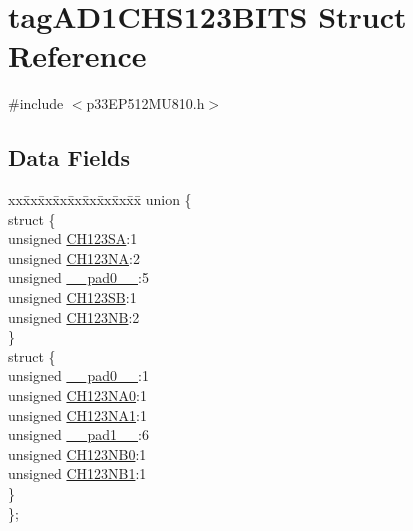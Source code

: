 \hypertarget{structtag_a_d1_c_h_s123_b_i_t_s}{}\section{tag\+A\+D1\+C\+H\+S123\+B\+I\+TS Struct Reference}
\label{structtag_a_d1_c_h_s123_b_i_t_s}


{\ttfamily \#include $<$p33\+E\+P512\+M\+U810.\+h$>$}

\subsection*{Data Fields}
\begin{DoxyCompactItemize}
\item 
\begin{tabbing}
xx\=xx\=xx\=xx\=xx\=xx\=xx\=xx\=xx\=\kill
union \{\\
\>struct \{\\
\>\>unsigned \hyperlink{structtag_a_d1_c_h_s123_b_i_t_s_aa5c792555a378a509a857e720d13fc00}{CH123SA}:1\\
\>\>unsigned \hyperlink{structtag_a_d1_c_h_s123_b_i_t_s_ab77f3f8df06242b31213cffdcdfd203b}{CH123NA}:2\\
\>\>unsigned \hyperlink{structtag_a_d1_c_h_s123_b_i_t_s_adf71f3d8410c1f1dbbc96680a92c49af}{\_\_pad0\_\_}:5\\
\>\>unsigned \hyperlink{structtag_a_d1_c_h_s123_b_i_t_s_a43fe4bf282da0b96630808288b9dfdd6}{CH123SB}:1\\
\>\>unsigned \hyperlink{structtag_a_d1_c_h_s123_b_i_t_s_aeaba540c7c535813510f4eb5ab86c92f}{CH123NB}:2\\
\>\} \\
\>struct \{\\
\>\>unsigned \hyperlink{structtag_a_d1_c_h_s123_b_i_t_s_adf71f3d8410c1f1dbbc96680a92c49af}{\_\_pad0\_\_}:1\\
\>\>unsigned \hyperlink{structtag_a_d1_c_h_s123_b_i_t_s_a1e3341ed38e13e66c36c360cfbf6845d}{CH123NA0}:1\\
\>\>unsigned \hyperlink{structtag_a_d1_c_h_s123_b_i_t_s_aaf160b5bc9911cc6291337cab1339e14}{CH123NA1}:1\\
\>\>unsigned \hyperlink{structtag_a_d1_c_h_s123_b_i_t_s_acaf2d0924a107ec6e8d2e31febaf66f9}{\_\_pad1\_\_}:6\\
\>\>unsigned \hyperlink{structtag_a_d1_c_h_s123_b_i_t_s_a5f8a569877f7f7bdfb2727a46fe99c69}{CH123NB0}:1\\
\>\>unsigned \hyperlink{structtag_a_d1_c_h_s123_b_i_t_s_a8eedf6488c82f199ac9e768c5f4d5f3e}{CH123NB1}:1\\
\>\} \\
\}; \\

\end{tabbing}\end{DoxyCompactItemize}


